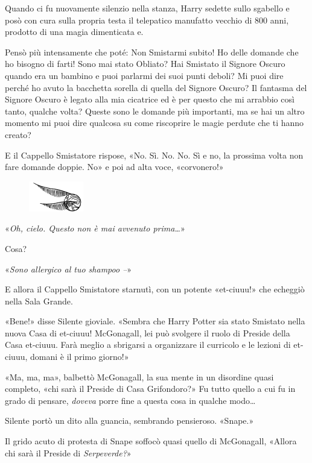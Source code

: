 Quando ci fu nuovamente silenzio nella stanza, Harry sedette sullo sgabello e posò con cura sulla propria testa il telepatico manufatto vecchio di 800 anni, prodotto di una magia dimenticata e.

Pensò più intensamente che poté: Non Smistarmi subito! Ho delle domande che ho bisogno di farti! Sono mai stato Obliato? Hai Smistato il Signore Oscuro quando era un bambino e puoi parlarmi dei suoi punti deboli? Mi puoi dire perché ho avuto la bacchetta sorella di quella del Signore Oscuro? Il fantasma del Signore Oscuro è legato alla mia cicatrice ed è per questo che mi arrabbio così tanto, qualche volta? Queste sono le domande più importanti, ma se hai un altro momento mi puoi dire qualcosa su come riscoprire le magie perdute che ti hanno creato?

E il Cappello Smistatore rispose, «No. Sì. No. No. Sì e no, la prossima volta non fare domande doppie. No» e poi ad alta voce, «corvonero!»

\begin{figure}[h]
	\includegraphics[scale=0.4]{boccino.png}
	\centering
\end{figure}

«\textit{Oh, cielo. Questo non è mai avvenuto prima…}»

Cosa?

«\textit{Sono allergico al tuo shampoo –}»

E allora il Cappello Smistatore starnutì, con un potente «et-ciuuu!» che echeggiò nella Sala Grande.

«Bene!» disse Silente gioviale. «Sembra che Harry Potter sia stato Smistato nella nuova Casa di et-ciuuu! McGonagall, lei può svolgere il ruolo di Preside della Casa et-ciuuu. Farà meglio a sbrigarsi a organizzare il curricolo e le lezioni di et-ciuuu, domani è il primo giorno!»

«Ma, ma, ma», balbettò McGonagall, la sua mente in un disordine quasi completo, «chi sarà il Preside di Casa Grifondoro?» Fu tutto quello a cui fu in grado di pensare, \textit{doveva} porre fine a questa cosa in qualche modo…

Silente portò un dito alla guancia, sembrando pensieroso. «Snape.»

Il grido acuto di protesta di Snape soffocò quasi quello di McGonagall, «Allora chi sarà il Preside di \textit{Serpeverde?}»

